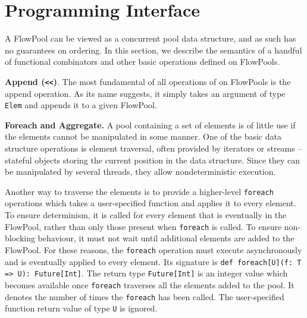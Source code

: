 \documentclass[runningheads,a4paper]{llncs}
\begin{document}
\section{Programming Interface}
\label{sec:programming-interface}

A FlowPool can be viewed as a concurrent pool data structure, and as such has
no guarantees on ordering. In this section, we describe the semantics of a
handful of functional combinators and other basic operations defined on
FlowPools.

\textbf{Append (\texttt{<<})}. The most fundamental of all
operations of on FlowPools is the append operation. As its name suggests, it
simply takes an argument of type \texttt{Elem} and appends it to a given
FlowPool. 



\textbf{Foreach and Aggregate.}
A pool containing a set of elements is of little use if the elements
cannot be manipulated in some manner.
One of the basic data structure operations is element traversal,
often provided by iterators or streams -- stateful
objects storing the current position in the data structure.
Since they can be manipulated by several threads, they allow
nondeterministic execution.

Another way to traverse the elements is to provide a higher-level
\verb=foreach= operations which takes a user-specified function and
applies it to every element.
To ensure determinism, it is called for every element that is
eventually in the FlowPool, rather than only those present
when \verb=foreach= is called.
To ensure non-blocking behaviour, it must not wait until
additional elements are added to the FlowPool.
For these reasons, the \verb=foreach= operation must execute
asynchronously and is eventually applied to every element.
Its signature is \verb+def foreach[U](f: T => U): Future[Int]+.
The return type \verb=Future[Int]= is an integer value which becomes
available once \verb=foreach= traverses all the elements added to the
pool.
It denotes the number of times the \verb=foreach= has been called.
The user-specified function return value of type \verb=U= is ignored.
\end{document}
